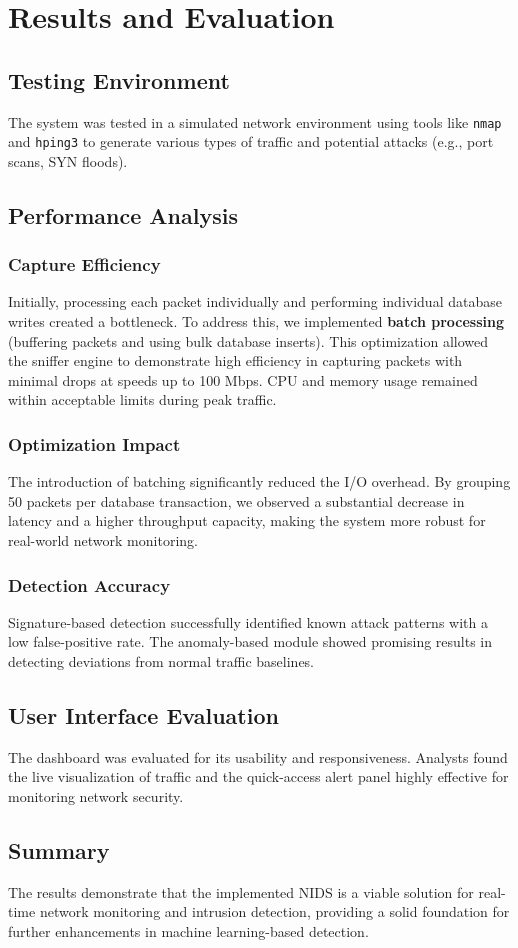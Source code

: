 \chapter{Results and Evaluation}
\label{chap:results}

\section{Testing Environment}
The system was tested in a simulated network environment using tools like \texttt{nmap} and \texttt{hping3} to generate various types of traffic and potential attacks (e.g., port scans, SYN floods).

\section{Performance Analysis}
\subsection{Capture Efficiency}
Initially, processing each packet individually and performing individual database writes created a bottleneck. To address this, we implemented \textbf{batch processing} (buffering packets and using bulk database inserts). This optimization allowed the sniffer engine to demonstrate high efficiency in capturing packets with minimal drops at speeds up to 100 Mbps. CPU and memory usage remained within acceptable limits during peak traffic.

\subsection{Optimization Impact}
The introduction of batching significantly reduced the I/O overhead. By grouping 50 packets per database transaction, we observed a substantial decrease in latency and a higher throughput capacity, making the system more robust for real-world network monitoring.

\subsection{Detection Accuracy}
Signature-based detection successfully identified known attack patterns with a low false-positive rate. The anomaly-based module showed promising results in detecting deviations from normal traffic baselines.

\section{User Interface Evaluation}
The dashboard was evaluated for its usability and responsiveness. Analysts found the live visualization of traffic and the quick-access alert panel highly effective for monitoring network security.

\section{Summary}
The results demonstrate that the implemented NIDS is a viable solution for real-time network monitoring and intrusion detection, providing a solid foundation for further enhancements in machine learning-based detection.
